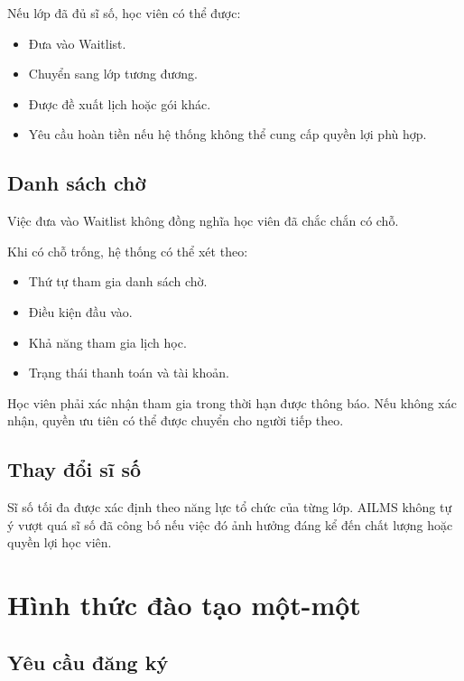 \documentclass[12pt,a4paper]{article}
\begin{document}
Nếu lớp đã đủ sĩ số, học viên có thể được:

\begin{itemize}
    \item Đưa vào Waitlist.
    \item Chuyển sang lớp tương đương.
    \item Được đề xuất lịch hoặc gói khác.
    \item Yêu cầu hoàn tiền nếu hệ thống không thể cung cấp quyền lợi phù hợp.
\end{itemize}

\subsection{Danh sách chờ}

Việc đưa vào Waitlist không đồng nghĩa học viên đã chắc chắn có chỗ.

Khi có chỗ trống, hệ thống có thể xét theo:

\begin{itemize}
    \item Thứ tự tham gia danh sách chờ.
    \item Điều kiện đầu vào.
    \item Khả năng tham gia lịch học.
    \item Trạng thái thanh toán và tài khoản.
\end{itemize}

Học viên phải xác nhận tham gia trong thời hạn được thông báo.
Nếu không xác nhận, quyền ưu tiên có thể được chuyển cho người tiếp theo.

\subsection{Thay đổi sĩ số}

Sĩ số tối đa được xác định theo năng lực tổ chức của từng lớp.
AILMS không tự ý vượt quá sĩ số đã công bố nếu việc đó ảnh hưởng đáng kể
đến chất lượng hoặc quyền lợi học viên.

\section{Hình thức đào tạo một-một}

\subsection{Yêu cầu đăng ký}
\end{document}
